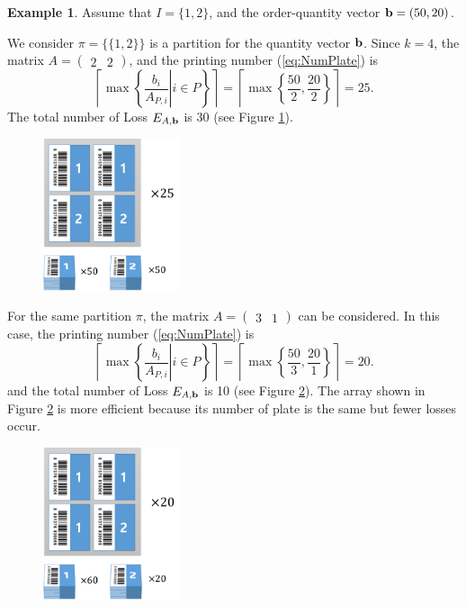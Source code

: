 \documentclass[a4paper]{amsart}
\numberwithin{equation}{section} %
\numberwithin{figure}{section} %
\numberwithin{table}{section}
\theoremstyle{plain}
\theoremstyle{definition}
\newtheorem{example}[thm]{Example}
\theoremstyle{plain}
\theoremstyle{plain}
\theoremstyle{plain}
\theoremstyle{plain}
\theoremstyle{plain}
\begin{document}
\begin{example}
	Assume that $I=\{1,2\}$, and the order-quantity vector ${\bf b}=(50,20)$.
	
	We consider $\pi = \{\{1,2\}\}$ is a partition for the quantity vector ${\bf b}$. Since $k = 4$, 
	the matrix $A = (\begin{array}{cc}2 & 2\end{array})$, and the printing number (\ref{eq:NumPlate}) is 
	\begin{equation}
	\left\lceil \max\left\{ \left. \frac{b_{i}}{A_{P,i}} \right| i \in P \right\} \right\rceil = \left\lceil \max \left\{ \frac{50}{2}, \frac{20}{2} \right\} \right\rceil = 25.
	\end{equation}
	The total number of Loss $E_{A,{\bf b}}$ is 30 (see Figure \ref{fig:ex21}).
	
	\begin{figure}[h!]
		\centering
		\includegraphics[width=4cm]{ex21.pdf}
		\caption{}
		\label{fig:ex21}       %
	\end{figure}
	
	For the same partition $\pi$, the matrix $A = (\begin{array}{cc}3 & 1\end{array})$ can be considered. In this case, the printing number (\ref{eq:NumPlate}) is 
	\begin{equation}
	\left\lceil \max\left\{ \left. \frac{b_{i}}{A_{P,i}} \right| i \in P \right\} \right\rceil = \left\lceil \max \left\{ \frac{50}{3}, \frac{20}{1} \right\} \right\rceil = 20.
	\end{equation}
	and the total number of Loss $E_{A,{\bf b}}$ is 10 (see Figure \ref{fig:ex22}).
	The array shown in Figure \ref{fig:ex22} is more efficient because its number of plate is the same but fewer losses occur.
	\begin{figure}[h!]
		\centering
		\includegraphics[width=4cm]{ex22.pdf}
		\caption{}
		\label{fig:ex22}       %
	\end{figure}
\end{example}
\end{document}
